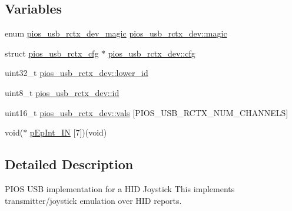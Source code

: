 \subsection*{\-Variables}
\begin{DoxyCompactItemize}
\item 
enum \hyperlink{group___p_i_o_s___u_s_b___r_c_t_x_gab6be8817fc2ea56ea36728686255d0dc}{pios\-\_\-usb\-\_\-rctx\-\_\-dev\-\_\-magic} \hyperlink{group___p_i_o_s___u_s_b___r_c_t_x_ga8f71b1caefbf4e9ed2a032bd56d63c73}{pios\-\_\-usb\-\_\-rctx\-\_\-dev\-::magic}
\item 
struct \hyperlink{structpios__usb__rctx__cfg}{pios\-\_\-usb\-\_\-rctx\-\_\-cfg} $\ast$ \hyperlink{group___p_i_o_s___u_s_b___r_c_t_x_gafd4556f7f9de22ef19636d97457b59b5}{pios\-\_\-usb\-\_\-rctx\-\_\-dev\-::cfg}
\item 
uint32\-\_\-t \hyperlink{group___p_i_o_s___u_s_b___r_c_t_x_gab5b742c93aa7545ca0a497ffb8b0c298}{pios\-\_\-usb\-\_\-rctx\-\_\-dev\-::lower\-\_\-id}
\item 
uint8\-\_\-t \hyperlink{group___p_i_o_s___u_s_b___r_c_t_x_ga6fff63358d7474743285bfc4a0297d46}{pios\-\_\-usb\-\_\-rctx\-\_\-dev\-::id}
\item 
uint16\-\_\-t \hyperlink{group___p_i_o_s___u_s_b___r_c_t_x_ga980974676b9de61965d90ed45d5ccab3}{pios\-\_\-usb\-\_\-rctx\-\_\-dev\-::vals} \mbox{[}\-P\-I\-O\-S\-\_\-\-U\-S\-B\-\_\-\-R\-C\-T\-X\-\_\-\-N\-U\-M\-\_\-\-C\-H\-A\-N\-N\-E\-L\-S\mbox{]}
\item 
void($\ast$ \hyperlink{group___p_i_o_s___u_s_b___r_c_t_x_ga0992c19a0f2e317fcd93f755d316a0fd}{p\-Ep\-Int\-\_\-\-I\-N} \mbox{[}7\mbox{]})(void)
\end{DoxyCompactItemize}


\subsection{\-Detailed \-Description}
\-P\-I\-O\-S \-U\-S\-B implementation for a \-H\-I\-D \-Joystick  \-This implements transmitter/joystick emulation over \-H\-I\-D reports. 

